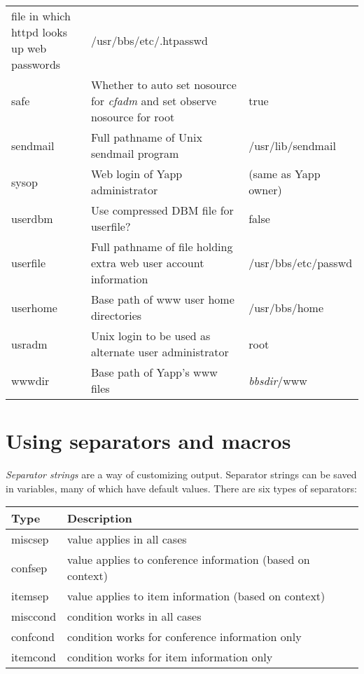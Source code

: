 \documentclass[twoside]{report}
\begin{document}
\begin{supertabular}{lp{7cm}l}
             file in which httpd looks up web passwords 
                                           & /usr/bbs/etc/.htpasswd\\
          safe                 & Whether to auto set nosource for 
             {\em cfadm} and set observe nosource for root & true\\
          sendmail         & Full pathname of Unix sendmail 
             program                       & /usr/lib/sendmail \\
          sysop               & Web login of Yapp administrator 
                                           & (same as Yapp owner)\\
          userdbm           & Use compressed DBM file for 
             userfile?                     & false \\
          userfile         & Full pathname of file holding 
             extra web user account information 
                                           & /usr/bbs/etc/passwd\\
          userhome         & Base path of www user home 
             directories                   &  /usr/bbs/home\\
          usradm             & Unix login to be used as 
             alternate user administrator  & root \\
          wwwdir             & Base path of Yapp's www files 
                                           & {\em bbsdir}/www \\
     \end{supertabular}

   \section{Using separators and macros} \label{s:sep}
      {\em Separator strings} are a way of customizing 
      output.  Separator strings can be saved in variables, many of which 
      have default values.  There are six types of separators:

      \vspace{12pt}
      \begin{tabular}{ll}
      Type & Description \\ \hline
      miscsep& value applies in all cases\\
      confsep& value applies to conference information (based on context)\\
      itemsep& value applies to item information (based on context) \\
      misccond& condition works in all cases\\
      confcond& condition works for conference information only\\
      itemcond& condition works for item information only\\ \hline
      \end{tabular}
      \vspace{12pt}
\end{document}
